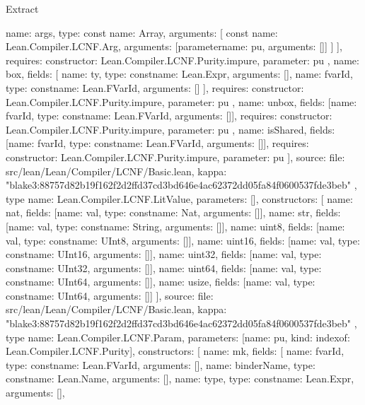 \begin{lexlean}{Extract}
\begin{toolingmodule}
{{{            {
              name: args,
              type: const{
                name: Array,
                arguments: [
                  const{
                    name: Lean.Compiler.LCNF.Arg,
                    arguments: [parameter{name: pu, arguments: []}]
                  }
                ]
              }
            }
          ],
          requires: {constructor: Lean.Compiler.LCNF.Purity.impure, parameter: pu}
        },
        {
          name: box,
          fields: [
            {name: ty, type: const{name: Lean.Expr, arguments: []}},
            {name: fvarId, type: const{name: Lean.FVarId, arguments: []}}
          ],
          requires: {constructor: Lean.Compiler.LCNF.Purity.impure, parameter: pu}
        },
        {
          name: unbox,
          fields: [{name: fvarId, type: const{name: Lean.FVarId, arguments: []}}],
          requires: {constructor: Lean.Compiler.LCNF.Purity.impure, parameter: pu}
        },
        {
          name: isShared,
          fields: [{name: fvarId, type: const{name: Lean.FVarId, arguments: []}}],
          requires: {constructor: Lean.Compiler.LCNF.Purity.impure, parameter: pu}
        }
      ],
      source: {
        file: src/lean/Lean/Compiler/LCNF/Basic.lean,
        kappa: "blake3:88757d82b19f162f2d2ffd37cd3bd646e4ac62372dd05fa84f0600537fde3beb"
      }
    },
    type{
      name: Lean.Compiler.LCNF.LitValue,
      parameters: [],
      constructors: [
        {name: nat, fields: [{name: val, type: const{name: Nat, arguments: []}}]},
        {name: str, fields: [{name: val, type: const{name: String, arguments: []}}]},
        {name: uint8, fields: [{name: val, type: const{name: UInt8, arguments: []}}]},
        {name: uint16, fields: [{name: val, type: const{name: UInt16, arguments: []}}]},
        {name: uint32, fields: [{name: val, type: const{name: UInt32, arguments: []}}]},
        {name: uint64, fields: [{name: val, type: const{name: UInt64, arguments: []}}]},
        {name: usize, fields: [{name: val, type: const{name: UInt64, arguments: []}}]}
      ],
      source: {
        file: src/lean/Lean/Compiler/LCNF/Basic.lean,
        kappa: "blake3:88757d82b19f162f2d2ffd37cd3bd646e4ac62372dd05fa84f0600537fde3beb"
      }
    },
    type{
      name: Lean.Compiler.LCNF.Param,
      parameters: [{name: pu, kind: index{of: Lean.Compiler.LCNF.Purity}}],
      constructors: [
        {
          name: mk,
          fields: [
            {name: fvarId, type: const{name: Lean.FVarId, arguments: []}},
            {name: binderName, type: const{name: Lean.Name, arguments: []}},
            {name: type, type: const{name: Lean.Expr, arguments: []}},
}}}
\end{toolingmodule}
\end{lexlean}
